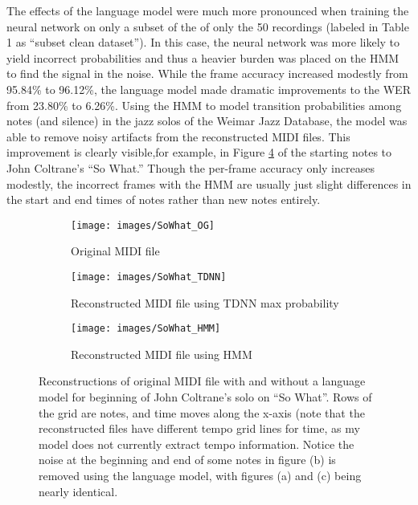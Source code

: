 \documentclass[conference]{IEEEtran}
\begin{document}
The effects of the language model were much more pronounced when training the neural network on only a subset of the of only the 50 recordings (labeled in Table 1 as ``subset clean dataset''). In this case, the neural network was more likely to yield incorrect probabilities and thus a heavier burden was placed on the HMM to find the signal in the noise. While the frame accuracy increased modestly from 95.84\% to 96.12\%, the language model made dramatic improvements to the WER from 23.80\% to 6.26\%. Using the HMM to model transition probabilities among notes (and silence) in the jazz solos of the Weimar Jazz Database, the model was able to remove noisy artifacts from the reconstructed MIDI files. This improvement is clearly visible,for example, in Figure \ref{fig:midipics} of the starting notes to John Coltrane's ``So What.'' Though the per-frame accuracy only increases modestly, the incorrect frames with the HMM are usually just slight differences in the start and end times of notes rather than new notes entirely.

\begin{figure}[H]
\centering
\begin{subfigure}[b]{0.45\textwidth}
   \texttt{[image: images/SoWhat\_OG]}
   \caption{Original MIDI file}
   \label{fig:Ng1} 
\end{subfigure}

\begin{subfigure}[b]{0.45\textwidth}
   \texttt{[image: images/SoWhat\_TDNN]}
   \caption{Reconstructed MIDI file using TDNN max probability}
   \label{fig:Ng1} 
\end{subfigure}

\begin{subfigure}[b]{0.45\textwidth}
   \texttt{[image: images/SoWhat\_HMM]}
   \caption{Reconstructed MIDI file using HMM}
   \label{fig:Ng2}
\end{subfigure}

\caption{Reconstructions of original MIDI file with and without a language model for beginning of John Coltrane's solo on ``So What''. Rows of the grid are notes, and time moves along the x-axis (note that the reconstructed files have different tempo grid lines for time, as my model does not currently extract tempo information. Notice the noise at the beginning and end of some notes in figure (b) is removed using the language model, with figures (a) and (c) being nearly identical.}

\label{fig:midipics}
\end{figure}
\end{document}

